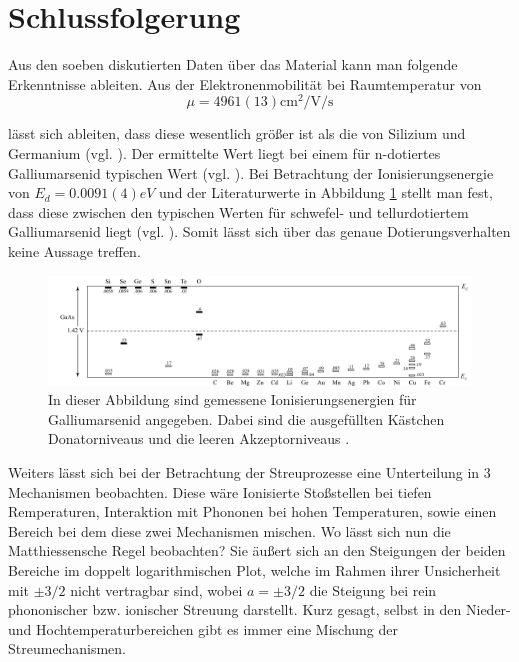 \section{Schlussfolgerung}

Aus den soeben diskutierten Daten über das Material kann man folgende Erkenntnisse ableiten. Aus der Elektronenmobilität bei Raumtemperatur von
$$\mu=4961(13) \unit{\square\cm\per\V\per\s}$$

lässt sich ableiten, dass diese wesentlich größer ist als die von Silizium und Germanium (vgl. \cite{Halbleiterwerkstoffe}). Der ermittelte Wert liegt bei einem für n-dotiertes Galliumarsenid typischen Wert (vgl. \cite{GaAsWaverDaten}). Bei Betrachtung der Ionisierungsenergie von $E_d=0.0091(4) \unit{eV}$ und der Literaturwerte in Abbildung \ref{fig:ePlotIonisierungsenergien} stellt man fest, dass diese zwischen den typischen Werten für schwefel- und tellurdotiertem Galliumarsenid liegt (vgl. \cite{sPhysikHalbleiterBautauelemnte}). Somit lässt sich über das genaue Dotierungsverhalten keine Aussage treffen.
\\
\begin{figure}
    \centering
    \includegraphics[width=\linewidth]{bilder/PlottIonisierungsenergien.png}
    \caption{
In dieser Abbildung sind gemessene Ionisierungsenergien für Galliumarsenid angegeben. Dabei sind die ausgefüllten Kästchen Donatorniveaus und die leeren Akzeptorniveaus \cite{sPhysikHalbleiterBautauelemnte}. }
    \label{fig:ePlotIonisierungsenergien}
\end{figure}



Weiters lässt sich bei der Betrachtung der Streuprozesse eine Unterteilung in 3 Mechanismen beobachten. Diese wäre Ionisierte Stoßstellen bei tiefen Remperaturen, Interaktion mit Phononen bei hohen Temperaturen, sowie einen Bereich bei dem diese zwei Mechanismen mischen. Wo lässt sich nun die Matthiessensche Regel beobachten?
Sie äußert sich an den Steigungen der beiden Bereiche im doppelt logarithmischen Plot, welche im Rahmen ihrer Unsicherheit mit $\pm 3/2$ nicht vertragbar sind, wobei $a = \pm 3/2$ die Steigung bei rein phononischer bzw. ionischer Streuung darstellt. Kurz gesagt, selbst in den Nieder- und Hochtemperaturbereichen gibt es immer eine Mischung der Streumechanismen.
\\


